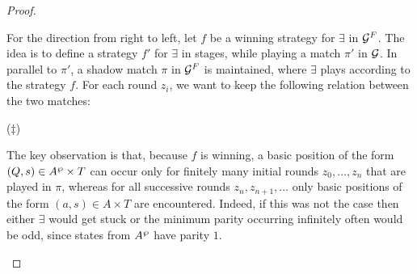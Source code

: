 \begin{proof}
\begin{enumerate}
      For the direction from right to left, let $f$ be a winning strategy for $\exists$ in $\mathcal{G}^{F}$. The idea is to define a strategy $f'$ for $\exists$ in stages, while playing a match $\pi'$ in $\mathcal{G}$. In parallel to $\pi'$, a shadow match $\pi$ in $\mathcal{G}^{F}$ is maintained, where $\exists$ plays according to the strategy $f$. For each round $z_i$, we want to keep the following relation between the two matches:
\smallskip
\begin{center}
\hspace*{0.3cm}($\ddag$)
\end{center}
\smallskip
The key observation is that, because $f$ is winning, a basic position of the form $(Q,s) \in A^{\wp} \times T$ can occur only for finitely many initial rounds $z_0,\dots,z_n$ that are played in $\pi$, whereas for all successive rounds $z_n,z_{n+1},\dots$ only basic positions of the form $(a,s) \in A \times T$ are encountered. Indeed, if this was not the case then either $\exists$ would get stuck or the minimum parity occurring infinitely often would be odd, since states from $A^{\wp}$ have parity $1$.


\end{enumerate}
\end{proof}
